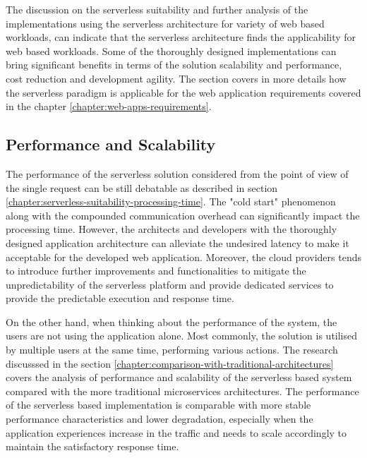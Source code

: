 The discussion on the serverless suitability and further analysis of the implementations using the serverless architecture for variety of web based workloads, can indicate that the serverless architecture finds the applicability for web based workloads. 
Some of the thoroughly designed implementations can bring significant benefits in terms of the solution scalability and performance, cost reduction and development agility.
The section covers in more details how the serverless paradigm is applicable for the web application requirements covered in the chapter \ref{chapter:web-apps-requirements}.



\subsection*{Performance and Scalability}

The performance of the serverless solution considered from the point of view of the single request can be still debatable as described in section \ref{chapter:serverless-suitability-processing-time}. 
The "cold start" phenomenon along with the compounded communication overhead can significantly impact the processing time. 
However, the architects and developers with the thoroughly designed application architecture can alleviate the undesired latency to make it acceptable for the developed web application.
Moreover, the cloud providers tends to introduce further improvements and functionalities to mitigate the unpredictability of the serverless platform and provide dedicated services to provide the predictable execution and response time.

On the other hand, when thinking about the performance of the system, the users are not using the application alone. 
Most commonly, the solution is utilised by multiple users at the same time, performing various actions. 
The research discusssed in the section \ref{chapter:comparison-with-traditional-architectures} covers the analysis of performance and scalability of the serverless based system compared with the more traditional microservices architectures. 
The performance of the serverless based implementation is comparable with more stable performance characteristics and lower degradation, especially when the application experiences increase in the traffic and needs to scale accordingly to maintain the satisfactory response time.

